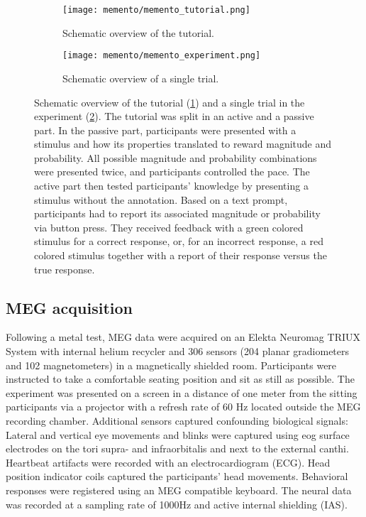 \begin{figure}
	\begin{subfigure}{.54\textwidth}
	\texttt{[image: memento/memento\_tutorial.png]}
	\caption{Schematic overview of the tutorial.}
	\label{fig:memento_tutorial}
	\end{subfigure}
	\begin{subfigure}{.45\textwidth}
	\texttt{[image: memento/memento\_experiment.png]}
	\caption{Schematic overview of a single trial.}
	\label{fig:memento_trial}
\end{subfigure}
	\caption[Memento: Tutorial and trial overview]{Schematic overview of the tutorial (\ref{fig:memento_tutorial}) and a single trial in the experiment (\ref{fig:memento_trial}).
	The tutorial was split in an active and a passive part.
	In the passive part, participants were presented with a stimulus and how its properties translated to reward magnitude and probability. All possible magnitude and probability combinations were presented twice, and participants controlled the pace. The active part then tested participants' knowledge by presenting a stimulus without the annotation. Based on a text prompt, participants had to report its associated magnitude or probability via button press. They received feedback with a green colored stimulus for a correct response, or, for an incorrect response, a red colored stimulus together with a report of their response versus the true response.
	}
\label{fig:memento}
\end{figure}


\subsection{MEG acquisition}

Following a metal test, MEG data were acquired on an Elekta Neuromag TRIUX System with internal helium recycler and 306 sensors (204 planar gradiometers and 102 magnetometers) in a magnetically shielded room.
Participants were instructed to take a comfortable seating position and sit as still as possible.
The experiment was presented on a screen in a distance of one meter from the sitting participants via a projector with a refresh rate of 60 Hz located outside the MEG recording chamber.
Additional sensors captured confounding biological signals:
Lateral and vertical eye movements and blinks were captured using \gls{eog} surface electrodes on the tori supra- and infraorbitalis and next to the external canthi.
Heartbeat artifacts were recorded with an electrocardiogram (ECG).
Head position indicator coils captured the participants' head movements.
Behavioral responses were registered using an MEG compatible keyboard.
The neural data was recorded at a sampling rate of 1000Hz and active internal shielding (IAS).


